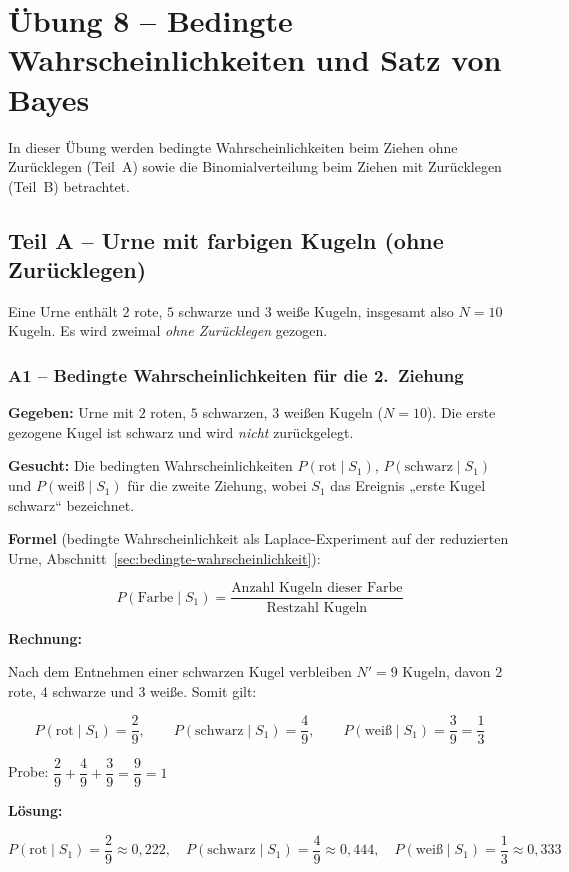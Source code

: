 \section{Übung 8 – Bedingte Wahrscheinlichkeiten und Satz von Bayes}

In dieser Übung werden bedingte Wahrscheinlichkeiten beim Ziehen ohne Zurücklegen
(Teil~A) sowie die Binomialverteilung beim Ziehen mit Zurücklegen (Teil~B)
betrachtet.

\subsection*{Teil A – Urne mit farbigen Kugeln (ohne Zurücklegen)}

Eine Urne enthält $2$ rote, $5$ schwarze und $3$ weiße Kugeln, insgesamt also
$N = 10$ Kugeln. Es wird zweimal \emph{ohne Zurücklegen} gezogen.

\subsubsection*{A1 – Bedingte Wahrscheinlichkeiten für die 2.\ Ziehung}

\begin{beispiel}

\textbf{Gegeben:} Urne mit $2$ roten, $5$ schwarzen, $3$ weißen Kugeln
($N = 10$). Die erste gezogene Kugel ist schwarz und wird \emph{nicht}
zurückgelegt.

\textbf{Gesucht:} Die bedingten Wahrscheinlichkeiten
$P(\text{rot} \mid S_1)$, $P(\text{schwarz} \mid S_1)$ und
$P(\text{weiß} \mid S_1)$ für die zweite Ziehung, wobei $S_1$ das Ereignis
„erste Kugel schwarz`` bezeichnet.

\textbf{Formel} (bedingte Wahrscheinlichkeit als Laplace-Experiment auf der
reduzierten Urne, Abschnitt~\ref{sec:bedingte-wahrscheinlichkeit}):

$$
P(\text{Farbe} \mid S_1) = \frac{\text{Anzahl Kugeln dieser Farbe}}{\text{Restzahl Kugeln}}
$$

\textbf{Rechnung:}

Nach dem Entnehmen einer schwarzen Kugel verbleiben $N' = 9$ Kugeln, davon
$2$ rote, $4$ schwarze und $3$ weiße. Somit gilt:

$$
P(\text{rot} \mid S_1) = \frac{2}{9}, \qquad
P(\text{schwarz} \mid S_1) = \frac{4}{9}, \qquad
P(\text{weiß} \mid S_1) = \frac{3}{9} = \frac{1}{3}
$$

Probe: $\dfrac{2}{9} + \dfrac{4}{9} + \dfrac{3}{9} = \dfrac{9}{9} = 1$ \checkmark

\textbf{Lösung:}

$$
\boxed{P(\text{rot} \mid S_1) = \frac{2}{9} \approx 0{,}222, \quad
P(\text{schwarz} \mid S_1) = \frac{4}{9} \approx 0{,}444, \quad
P(\text{weiß} \mid S_1) = \frac{1}{3} \approx 0{,}333}
$$

\end{beispiel}

